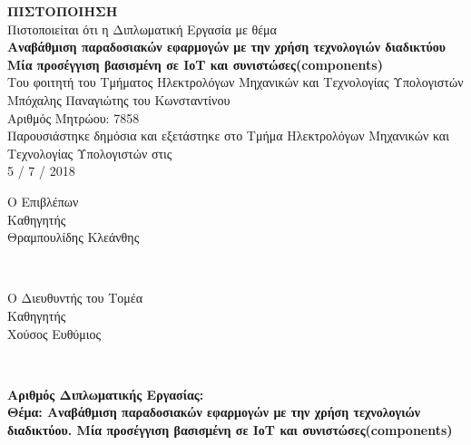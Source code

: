 \pagestyle{empty}

\begin{center}



{\Large \textbf{ΠΙΣΤΟΠΟΙΗΣΗ}} \\[1 cm]
Πιστοποιείται ότι η Διπλωματική Εργασία με θέμα \\[2 cm]

{\large \textbf{Αναβάθμιση παραδοσιακών εφαρμογών με την χρήση τεχνολογιών διαδικτύου \\ Μία προσέγγιση βασισμένη σε ΙοΤ και συνιστώσες(components)}} \\[2 cm]


Του φοιτητή του Τμήματος Ηλεκτρολόγων Μηχανικών και Τεχνολογίας Υπολογιστών \\[2 cm]


Μπόχαλης Παναγιώτης του Κωνσταντίνου \\
Αριθμός Μητρώου: 7858 \\[2 cm]


Παρουσιάστηκε δημόσια και εξετάστηκε στο Τμήμα Ηλεκτρολόγων Μηχανικών και Τεχνολογίας Υπολογιστών στις \\
5 / 7 / 2018\\[2cm]

\begin{minipage}{0.45\textwidth}
\begin{flushleft} \center
Ο Επιβλέπων\\[1cm]
Καθηγητής\\
Θραμπουλίδης Κλεάνθης
\end{flushleft}
\end{minipage}
~
\begin{minipage}{0.45\textwidth}
\begin{flushright}  \center
Ο Διευθυντής του Τομέα \\[1cm]
Καθηγητής\\
Χούσος Ευθύμιος\\
\end{flushright}
\end{minipage}\\[2cm]

\end{center}
\newpage \thispagestyle{empty} \mbox{}
\newpage
{\large \textbf{Αριθμός Διπλωματικής Εργασίας:} \\[2cm]
\textbf{Θέμα: Αναβάθμιση παραδοσιακών εφαρμογών με την χρήση τεχνολογιών διαδικτύου. Μία προσέγγιση βασισμένη σε ΙοΤ και συνιστώσες(components)} } \\[2cm]

